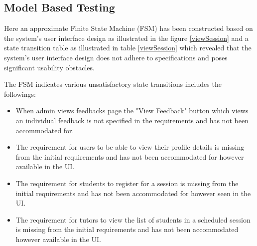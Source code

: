 \subsection{Model Based Testing}
\begin{justify}
    Here an approximate Finite State Machine (FSM) has been constructed based on the system’s user interface design as illustrated in the figure {\ref{viewSession}} and a state transition table as illustrated in table {\ref{viewSession}} which revealed that the system’s user interface design does not adhere to specifications and poses significant usability obstacles.

    \vspace{0.25cm}
    \newendline The FSM indicates various unsatisfactory state transitions includes the followings:
    \begin{itemize}
        \item When admin views feedbacks page the "View Feedback" button which views an individual feedback is not specified in the requirements and has not been accommodated for.

        \item The requirement for users to be able to view their profile details is missing from the initial requirements and has not been accommodated for however available in the UI.

        \item The requirement for students to register for a session is missing from the initial requirements and has not been accommodated for however seen in the UI.

        \item The requirement for tutors to view the list of students in a scheduled session is missing from the initial requirements and has not been accommodated however available in the UI.\\
    \end{itemize}


\end{justify}
